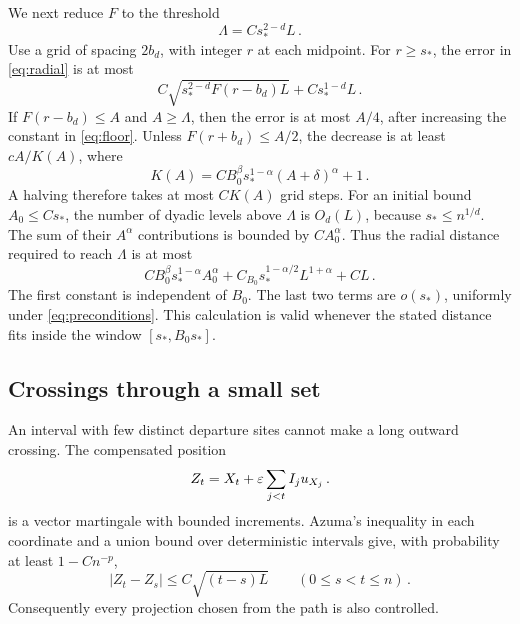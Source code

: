 We next reduce $F$ to the threshold
\begin{equation}\label{eq:floor}
\Lambda=Cs_*^{2-d}L\, .
\end{equation}
Use a grid of spacing $2b_d$, with integer $r$ at each midpoint.
For $r\geq s_*$, the error in \eqref{eq:radial} is at most
\begin{equation}\label{eq:halving-error}
C\sqrt{s_*^{2-d}F(r-b_d)L}+Cs_*^{1-d}L\, .
\end{equation}
If $F(r-b_d)\leq A$ and $A\geq\Lambda$, then the error is at most
$A/4$, after increasing the constant in \eqref{eq:floor}.
Unless $F(r+b_d)\leq A/2$, the decrease is at least $cA/K(A)$,
where
\begin{equation}\label{eq:halving-K}
K(A)=CB_0^\beta s_*^{1-\alpha}(A+\delta)^\alpha+1\, .
\end{equation}
A halving therefore takes at most $CK(A)$ grid steps.
For an initial bound $A_0\leq Cs_*$, the number of dyadic levels
above $\Lambda$ is $O_d(L)$, because $s_*\leq n^{1/d}$.
The sum of their $A^\alpha$ contributions is bounded by
$CA_0^\alpha$. Thus the radial distance required to reach $\Lambda$
is at most
\begin{equation}\label{eq:halving-cost}
CB_0^\beta s_*^{1-\alpha}A_0^\alpha
+C_{B_0}s_*^{1-\alpha/2}L^{1+\alpha}+CL\, .
\end{equation}
The first constant is independent of $B_0$.
The last two terms are $o(s_*)$, uniformly under \eqref{eq:preconditions}.
This calculation is valid whenever the stated distance fits inside
the window $[s_*,B_0s_*]$.

\subsection{Crossings through a small set}
An interval with few distinct departure sites cannot make a long
outward crossing.
The compensated position
\begin{equation}\label{eq:vector-def}
Z_t=X_t+\varepsilon\sum_{j<t}I_ju_{X_j}\, .
\end{equation}
is a vector martingale with bounded increments.
Azuma's inequality in each coordinate and a union bound over deterministic
intervals give, with probability at least $1-Cn^{-p}$,
\begin{equation}\label{eq:vector}
|Z_t-Z_s|\leq C\sqrt{(t-s)L}
\qquad(0\leq s<t\leq n)\, .
\end{equation}
Consequently every projection chosen from the path is also controlled.

